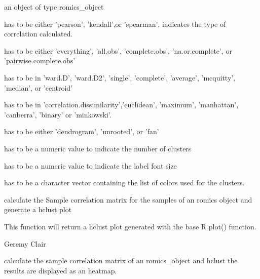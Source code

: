 \documentclass[a4paper]{book}
\begin{document}
\begin{Arguments}
\begin{ldescription}
\item[\code{romics\_object}] an object of type romics\_object

\item[\code{corr\_type}] has to be either 'pearson', 'kendall',or 'spearman', indicates the type of correlation calculated.

\item[\code{use}] has to be either 'everything', 'all.obs', 'complete.obs', 'na.or.complete', or 'pairwise.complete.obs'

\item[\code{hclust\_method}] has to be in 'ward.D', 'ward.D2', 'single', 'complete', 'average', 'mcquitty', 'median', or 'centroid'

\item[\code{dist\_method}] has to be in 'correlation.dissimilarity','euclidean', 'maximum', 'manhattan', 'canberra', 'binary' or 'minkowski'.

\item[\code{plot\_type}] has to be either 'dendrogram', 'unrooted', or 'fan'

\item[\code{number\_of\_clusters}] has to be a numeric value to indicate the number of clusters

\item[\code{cex}] has to be a numeric value to indicate the label font size

\item[\code{cluster\_colors}] has to be a character vector containing the list of colors used for the clusters.
\end{ldescription}
\end{Arguments}
%
\begin{Details}
calculate the Sample correlation matrix for the samples of an romics object and generate a hclust plot
\end{Details}
%
\begin{Value}
This function will return a hclust plot generated with the base R plot() function.
\end{Value}
%
\begin{Author}
Geremy Clair
\end{Author}
%
\begin{Description}
calculate the sample correlation matrix of an romics\_object and hclust the results are displayed as an heatmap.
\end{Description}
\end{document}
